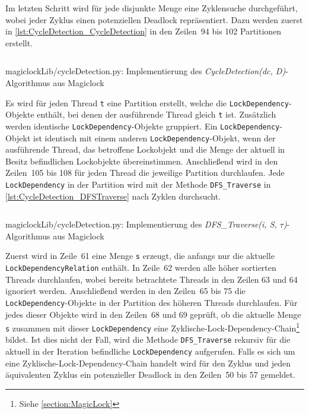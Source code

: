 Im letzten Schritt wird für jede disjunkte Menge eine Zyklensuche durchgeführt,
wobei jeder Zyklus einen potenziellen Deadlock repräsentiert. Dazu werden zuerst
in \cref{lst:CycleDetection_CycleDetection} in den Zeilen~94 bis 102 Partitionen
erstellt.
\begin{listing}[ht]
  \inputminted[frame=lines,linenos,firstline=78,lastline=108]{python}{./Python/magiclockLib/cycleDetection.py}
  \caption{magiclockLib/cycleDetection.py: Implementierung des \emph{CycleDetection(dc, D)}-Algorithmus aus Magiclock \autocite[8]{MagicLock}}
  \label{lst:CycleDetection_CycleDetection}
\end{listing}
Es wird für jeden Thread \texttt{t} eine Partition erstellt, welche die
\texttt{Lock\-Dependency}-Objekte enthält, bei denen der ausführende Thread
gleich \texttt{t} ist. Zusätzlich werden identische
\texttt{Lock\-Dependency}-Objekte gruppiert. Ein
\texttt{Lock\-Dependency}-Objekt ist identisch mit einem anderen
\texttt{Lock\-Dependency}-Objekt, wenn der ausführende Thread, das betroffene
Lockobjekt und die Menge der aktuell in Besitz befindlichen Lockobjekte
übereinstimmen. Anschließend wird in den Zeilen~105 bis 108 für jeden Thread die
jeweilige Partition durchlaufen. Jede \texttt{Lock\-Dependency} in der Partition
wird mit der Methode \texttt{DFS\_Traverse} in
\cref{lst:CycleDetection_DFSTraverse} nach Zyklen durchsucht.
\begin{listing}[ht]
  \inputminted[frame=lines,linenos,firstline=50,lastline=75]{python}{./Python/magiclockLib/cycleDetection.py}
  \caption{magiclockLib/cycleDetection.py: Implementierung des \emph{DFS\_Traverse(i, S, $\tau$)}-Algorithmus aus Magiclock \autocite[8]{MagicLock}}
  \label{lst:CycleDetection_DFSTraverse}
\end{listing}

Zuerst wird in Zeile~61 eine Menge \texttt{s} erzeugt, die anfangs nur die
aktuelle \texttt{Lock\-Dependency\-Relation} enthält. In Zeile~62 werden alle
höher sortierten Threads durchlaufen, wobei bereits betrachtete Threads in den
Zeilen 63 und 64 ignoriert werden. Anschließend werden in den Zeilen~65 bis 75
die \texttt{Lock\-Dependency}-Objekte in der Partition des höheren Threads
durchlaufen. Für jedes dieser Objekte wird in den Zeilen~68 und 69 geprüft, ob
die aktuelle Menge \texttt{s} zusammen mit dieser \texttt{Lock\-Dependency} eine
Zyklische-Lock-Dependency-Chain\footnote{Siehe \cref{section:MagicLock}} bildet.
Ist dies nicht der Fall, wird die Methode \texttt{DFS\_Traverse} rekursiv für
die aktuell in der Iteration befindliche \texttt{Lock\-Dependency} aufgerufen.
Falls es sich um eine Zyklische-Lock-Dependency-Chain handelt wird für den
Zyklus und jeden äquivalenten Zyklus ein potenzieller Deadlock in den Zeilen~50
bis 57 gemeldet.